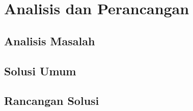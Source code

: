 \chapter{Analisis dan Perancangan}

\section{Analisis Masalah}
\blindtext

\section{Solusi Umum}
\blindtext

\section{Rancangan Solusi}
\blindtext